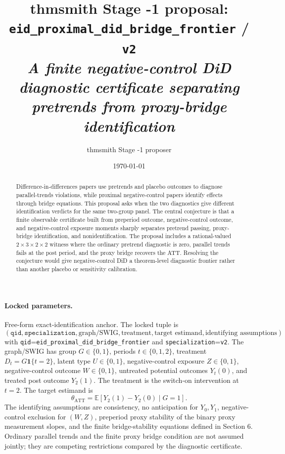 \documentclass[11pt]{article}
\title{thmsmith Stage -1 proposal: \texttt{eid\_proximal\_did\_bridge\_frontier} / \texttt{v2}%
  \\ \large\textit{A finite negative-control DiD diagnostic certificate separating pretrends from proxy-bridge identification}}
\author{thmsmith Stage -1 proposer}
\date{\today}
\newcommand{\E}{\mathbb{E}}
\newcommand{\one}{\mathbf{1}}
\theoremstyle{definition}
\theoremstyle{plain}
\theoremstyle{remark}
\begin{document}
\maketitle


\paragraph{Locked parameters.}
Free-form exact-identification anchor. The locked tuple is
\[
(\texttt{qid},\texttt{specialization},\text{graph/SWIG},\text{treatment},
\text{target estimand},\text{identifying assumptions})
\]
with \texttt{qid}=\texttt{eid\_proximal\_did\_bridge\_frontier} and
\texttt{specialization}=\texttt{v2}. The graph/SWIG has group
$G\in\{0,1\}$, periods $t\in\{0,1,2\}$, treatment $D_t=G\one\{t=2\}$,
latent type $U\in\{0,1\}$, negative-control exposure $Z\in\{0,1\}$, negative-control
outcome $W\in\{0,1\}$, untreated potential outcomes $Y_t(0)$, and treated
post outcome $Y_2(1)$. The treatment is the switch-on intervention at $t=2$.
The target estimand is
\[
\theta_{\mathrm{ATT}}=\E[Y_2(1)-Y_2(0)\mid G=1].
\]
The identifying assumptions are consistency, no anticipation for $Y_0,Y_1$,
negative-control exclusion for $(W,Z)$, preperiod proxy stability of the
binary proxy measurement slopes, and the finite bridge-stability equations
defined in Section 6. Ordinary parallel trends and the finite proxy bridge
condition are not assumed jointly; they are competing restrictions compared
by the diagnostic certificate.

\begin{abstract}
Difference-in-differences papers use pretrends and placebo outcomes to diagnose
parallel-trends violations, while proximal negative-control papers identify
effects through bridge equations. This proposal asks when the two diagnostics
give different identification verdicts for the same two-group panel. The
central conjecture is that a finite observable certificate built from
preperiod outcome, negative-control outcome, and negative-control exposure
moments sharply separates pretrend passing, proxy-bridge identification, and
nonidentification. The proposal includes a rational-valued
$2\times3\times2\times2$ witness where the ordinary pretrend diagnostic is
zero, parallel trends fails at the post period, and the proxy bridge recovers
the ATT. Resolving the conjecture would give negative-control DiD a theorem-level
diagnostic frontier rather than another placebo or sensitivity calibration.
\end{abstract}
\end{document}
